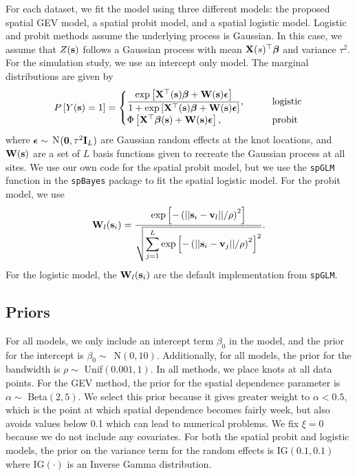 \documentclass[12pt]{article}
\begin{document}
For each dataset, we fit the model using three different models: the proposed spatial GEV model, a spatial probit model, and a spatial logistic model.
Logistic and probit methods assume the underlying process is Gaussian.
In this case, we assume that $Z(\mathbf{s})$ follows a Gaussian process with mean $\mathbf{X}(s)^\top \mbox{\boldmath $\beta$}$ and variance $\tau^2$.
For the simulation study, we use an intercept only model.
The marginal distributions are given by
\begin{align}
P\left[Y(\mathbf{s}) = 1\right] = \begin{cases}
\displaystyle \frac{\exp\left[\mathbf{X}^\top(\mathbf{s}) \mbox{\boldmath $\beta$} + \mathbf{W} (\mathbf{s}) \mbox{\boldmath $\epsilon$} \right]}{1 + \exp\left[\mathbf{X}^\top(\mathbf{s}) \mbox{\boldmath $\beta$} + \mathbf{W} (\mathbf{s}) \mbox{\boldmath $\epsilon$} \right]}, \qquad &\text{logistic}\\
\Phi\left[\mathbf{X}^\top \mbox{\boldmath $\beta$} (\mathbf{s}) + \mathbf{W} (\mathbf{s}) \mbox{\boldmath $\epsilon$} \right], \qquad &\text{probit}
\end{cases}
\end{align}
where $\mbox{\boldmath $\epsilon$} \sim$ N$(\mathbf{0}, \tau^2 \mathbf{I}_L)$ are Gaussian random effects at the knot locations, and $\mathbf{W}(\mathbf{s})$ are a set of $L$ basis functions given to recreate the Gaussian process at all sites.
We use our own code for the spatial probit model, but we use the \texttt{spGLM} function in the \texttt{spBayes} package \citep{Finley2015} to fit the spatial logistic model.
For the probit model, we use
\begin{align}
\mathbf{W}_l(\mathbf{s}_i) = \frac{\exp\left[-\left(||\mathbf{s}_i-\mathbf{v}_l||/\rho\right)^2\right]}
{\sqrt{\displaystyle \sum_{j=1}^L\exp\left[-\left(||\mathbf{s}_i-\mathbf{v}_j||/\rho\right)^2\right]^2}}.
\end{align}
For the logistic model, the $\mathbf{W}_l(\mathbf{s}_i)$ are the default implementation from \texttt{spGLM}.

\subsection{Priors} \label{rbs:simpriors}

For all models, we only include an intercept term $\beta_0$ in the model, and the prior for the intercept is \mbox{$\beta_0 \sim$ N$(0, 10)$}.
Additionally, for all models, the prior for the bandwidth is $\rho \sim$ Unif$(0.001, 1)$.
In all methods, we place knots at all data points.
For the GEV method, the prior for the spatial dependence parameter is $\alpha \sim$ Beta$(2, 5)$.
We select this prior because it gives greater weight to $\alpha < 0.5$, which is the point at which spatial dependence becomes fairly week, but also avoids values below 0.1 which can lead to numerical problems.
We fix $\xi = 0$ because we do not include any covariates.
For both the spatial probit and logistic models, the prior on the variance term for the random effects is IG$(0.1, 0.1)$ where IG$(\cdot)$ is an Inverse Gamma distribution.
\end{document}
